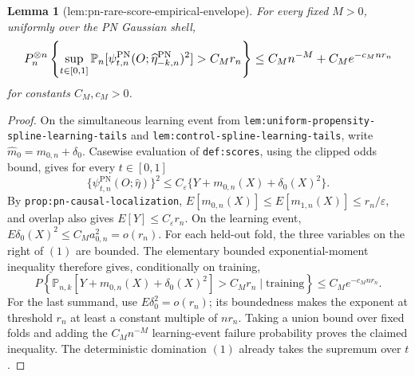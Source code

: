 \documentclass{article}
\newtheorem{lemma}{Lemma}
\begin{document}
\begin{lemma}[lem:pn-rare-score-empirical-envelope]\label{lem:pn-rare-score-empirical-envelope}
For every fixed \(M>0\), uniformly over the PN Gaussian shell,
\[
\makebox[\linewidth][c]{\resizebox{0.98\linewidth}{!}{\par\noindent \makebox[\linewidth][c]{\resizebox{0.98\linewidth}{!}{\(\displaystyle \displaystyle P_n^{\otimes n}\left\{\sup_{t\in[0,1]}\mathbb P_n[\psi_{t,n}^{\mathrm{PN}}(O;\widehat\eta_{-k,n}^{\mathrm{PN}})^2]>C_Mr_n\right\}\le C_Mn^{-M}+C_Me^{-c_Mnr_n}\)}}\par\noindent}}
\]
for constants \(C_M,c_M>0\).
\end{lemma}
\begin{proof}
On the simultaneous learning event from \texttt{lem:uniform-propensity-spline-learning-tails} and \texttt{lem:control-spline-learning-tails}, write \(\widehat m_0=m_{0,n}+\delta_0\). Casewise evaluation of \texttt{def:scores}, using the clipped odds bound, gives for every \(t\in[0,1]\)
\[\{\psi_{t,n}^{\mathrm{PN}}(O;\widehat\eta)\}^2\le C_\varepsilon\{Y+m_{0,n}(X)+\delta_0(X)^2\}.\tag{1}\]
By \texttt{prop:pn-causal-localization}, \(E[m_{0,n}(X)]\le E[m_{1,n}(X)]\le r_n/\varepsilon\), and overlap also gives \(E[Y]\le C_\varepsilon r_n\). On the learning event, \(E\delta_0(X)^2\le C_Ma_{0,n}^2=o(r_n)\). For each held-out fold, the three variables on the right of \((1)\) are bounded. The elementary bounded exponential-moment inequality therefore gives, conditionally on training,
\[P\left\{\mathbb P_{n,k}[Y+m_{0,n}(X)+\delta_0(X)^2]>C_Mr_n\mid\text{training}\right\}\le C_Me^{-c_Mnr_n}.\tag{2}\]
For the last summand, use \(E\delta_0^2=o(r_n)\); its boundedness makes the exponent at threshold \(r_n\) at least a constant multiple of \(nr_n\). Taking a union bound over fixed folds and adding the \(C_Mn^{-M}\) learning-event failure probability proves the claimed inequality. The deterministic domination \((1)\) already takes the supremum over \(t\).
\end{proof}
\end{document}
